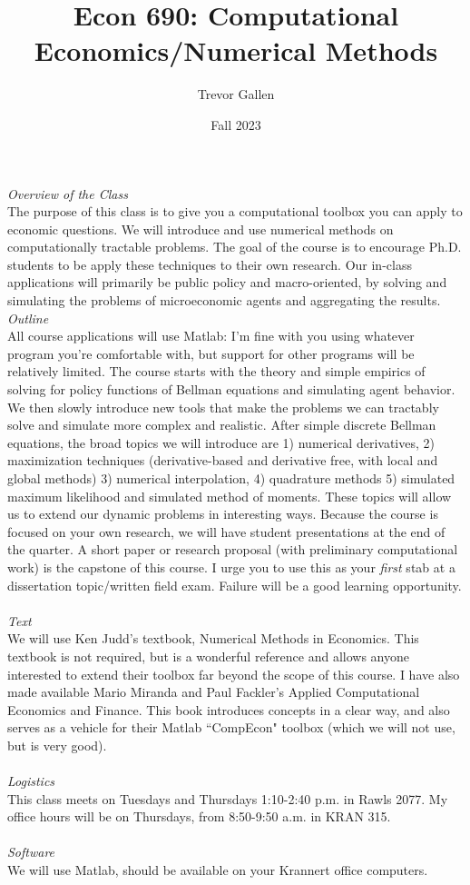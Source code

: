 \documentclass[a4paper]{article}
\title{Econ 690: Computational Economics/Numerical Methods}
\author{Trevor Gallen}
\date{Fall 2023}
\begin{document}


\maketitle
\emph{Overview of the Class}\\
The purpose of this class is to give you a computational toolbox you can apply to economic questions.  We will introduce and use numerical methods on computationally tractable problems.  The goal of the course is to encourage Ph.D. students to be apply these techniques to their own research.  Our in-class applications will primarily be public policy and macro-oriented, by solving and simulating the problems of microeconomic agents and aggregating the results. \\

\emph{Outline}\\
All course applications will use Matlab: I'm fine with you using whatever program you're comfortable with, but support for other programs will be relatively limited.  The course starts with the theory and simple empirics of solving for policy functions of Bellman equations and simulating agent behavior.  We then slowly introduce new tools that make the problems we can tractably solve and simulate more complex and realistic.  After simple discrete Bellman equations, the broad topics we will introduce are 1) numerical derivatives, 2) maximization techniques (derivative-based and derivative free, with local and global methods) 3)  numerical interpolation, 4) quadrature methods 5) simulated maximum likelihood and simulated method of moments.  These topics will allow us to extend our dynamic problems in interesting ways.  Because the course is focused on your own research, we will have student presentations at the end of the quarter.  A short paper or research proposal (with preliminary computational work) is the capstone of this course. I urge you to use this as your \emph{first} stab at a dissertation topic/written field exam.  Failure will be a good learning opportunity.\\
\ \\
\emph{Text}\\
We will use Ken Judd's textbook, Numerical Methods in Economics.  This textbook is not required, but is a wonderful reference and allows anyone interested to extend their toolbox far beyond the scope of this course. I have also made available Mario Miranda and Paul Fackler's Applied Computational Economics and Finance.  This book introduces concepts in a clear way, and also serves as a vehicle for their Matlab ``CompEcon" toolbox (which we will not use, but is very good). \\
\ \\
\emph{Logistics}\\
This class meets on Tuesdays and Thursdays 1:10-2:40 p.m. in Rawls 2077. My office hours will be on Thursdays, from 8:50-9:50 a.m. in KRAN 315.\\
\ \\
\emph{Software}\\
We will use Matlab, should be available on your Krannert office computers.  \\
\end{document}
